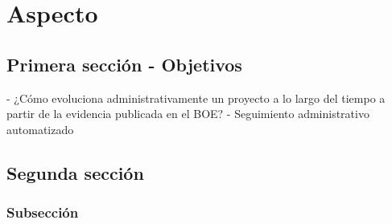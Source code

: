 \chapter{Aspecto}
\lipsum[1-5]
\section{Primera sección - Objetivos}
- ¿Cómo evoluciona administrativamente un proyecto a lo largo del tiempo a partir de la evidencia publicada en el BOE?
- Seguimiento administrativo automatizado


\section{Segunda sección}
\lipsum[1-5]
\subsection{Subsección}
\lipsum[1-6]
